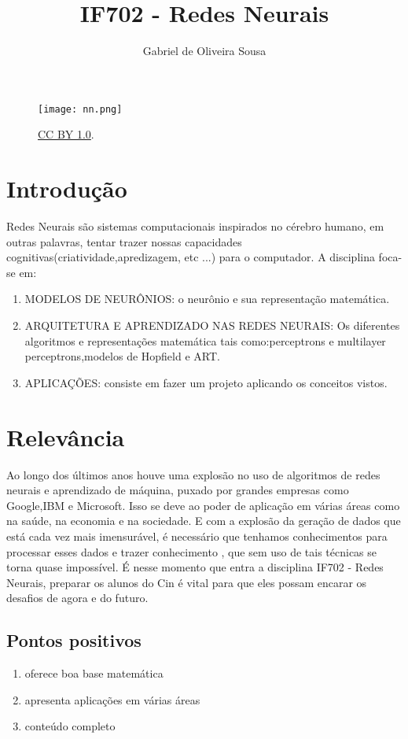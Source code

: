 \documentclass[a4paper,10pt]{article}
\title{IF702 - Redes Neurais}
\author{Gabriel de Oliveira Sousa}
\begin{document}
\maketitle



\begin{figure}[h]
\centering
\texttt{[image: nn.png]}
\caption{\label{fig:redes} \href{http://www.latex-tutorial.com}{CC BY 1.0}. }
\end{figure}

\section{Introdução}

Redes Neurais são sistemas computacionais inspirados no cérebro humano, em outras palavras, tentar trazer nossas capacidades cognitivas(criatividade,apredizagem, etc ...) para o computador. A disciplina foca-se em:

\begin{enumerate}
\item MODELOS DE NEURÔNIOS: o neurônio e sua representação matemática.
\item ARQUITETURA E APRENDIZADO NAS REDES NEURAIS: Os diferentes algoritmos e representações matemática tais como:perceptrons e multilayer perceptrons,modelos de Hopfield e ART.
\item APLICAÇÕES: consiste em fazer um projeto aplicando os conceitos vistos. 
\end{enumerate}

\section{Relevância}



Ao longo dos últimos anos houve uma explosão no uso de algoritmos de redes neurais e aprendizado de máquina, puxado por grandes empresas como Google,IBM e Microsoft. Isso se deve ao poder de aplicação em várias áreas como na saúde, na economia e na sociedade. E com a explosão da geração de dados que está cada vez mais imensurável, é necessário que tenhamos conhecimentos para processar esses dados e trazer conhecimento , que sem uso de tais técnicas se torna quase impossível. É nesse momento que entra a disciplina IF702 - Redes Neurais, preparar os alunos do Cin é vital para que eles possam encarar os desafios de agora e do futuro.

\subsection{Pontos positivos}
\begin{enumerate}
\item oferece boa base matemática
\item apresenta aplicações em várias áreas
\item conteúdo completo
\end{enumerate}
\end{document}
